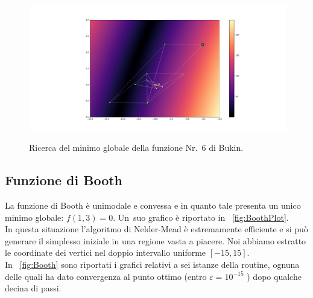 \begin{figure}
	\label{fig:RelativeBukin}
\end{figure}

\begin{figure}
	\centering
	\caption{Ricerca del minimo globale della funzione Nr.~6 di Bukin.}
	\includegraphics[width=\textwidth, trim={10cm 2cm 8cm 2cm}, clip]{Immagini/AbsoluteBukinBig.pdf}
	\label{fig:AbsoluteBukin}
\end{figure}

\newpage

\subsection*{Funzione di Booth}
\bigskip
La funzione di Booth è unimodale e convessa e in quanto tale presenta un unico minimo globale: $f(1,3) = 0$. Un~suo grafico è riportato in \figurename~\ref{fig:BoothPlot}.\\

\noindent In questa situazione l'algoritmo di Nelder-Mead è estremamente efficiente e si può generare il simplesso iniziale in una regione vasta a piacere. Noi abbiamo estratto le coordinate dei vertici nel doppio intervallo uniforme $[-15,15]$.\\

\noindent In \figurename~\ref{fig:Booth} sono riportati i grafici relativi a sei istanze della routine, ognuna delle quali ha dato convergenza al punto ottimo (entro $\varepsilon = 10^{-15}$ ) dopo qualche decina di passi.\\

